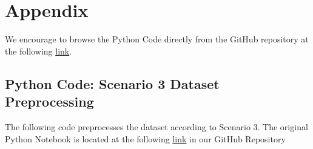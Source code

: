 \documentclass[10pt,twocolumn,letterpaper]{article}
\begin{document}

{\small


}

\clearpage %
\onecolumn %

\section{Appendix}
\label{sec:appendix}

We encourage to browse the Python Code directly from the GitHub repository at the following \href{https://github.com/TannerAGraves/GPT-LieDetection/}{link}.

\subsection{Python Code: Scenario 3 Dataset Preprocessing}

The following code preprocesses the dataset according to Scenario 3.
The original Python Notebook is located at the following \href{https://colab.research.google.com/github/TannerAGraves/GPT-LieDetection/blob/main/dataset/datasets.ipynb}{link} in our GitHub Repository
\end{document}
